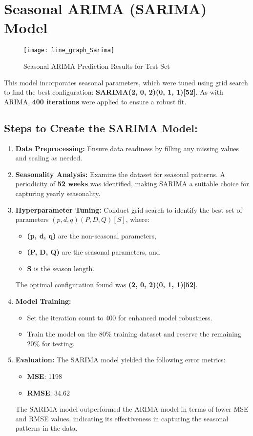 \section*{Seasonal ARIMA (SARIMA) Model}

\begin{figure}[H]
	\centering
	\texttt{[image: line\_graph\_Sarima]}
	\caption{Seasonal ARIMA Prediction Results for Test Set}
	\label{fig:Sarima_result}
\end{figure}

This model incorporates seasonal parameters, which were tuned using grid search to find the best configuration: \textbf{SARIMA(2, 0, 2)(0, 1, 1)[52]}. As with ARIMA, \textbf{400 iterations} were applied to ensure a robust fit.

\subsection*{Steps to Create the SARIMA Model:}
\begin{enumerate}
	\item \textbf{Data Preprocessing:}  
	Ensure data readiness by filling any missing values and scaling as needed.
	
	\item \textbf{Seasonality Analysis:}  
	Examine the dataset for seasonal patterns. A periodicity of \textbf{52 weeks} was identified, making SARIMA a suitable choice for capturing yearly seasonality.
	
	\item \textbf{Hyperparameter Tuning:}  
	Conduct grid search to identify the best set of parameters $(p, d, q)(P, D, Q)[S]$, where:
	\begin{itemize}
		\item \textbf{(p, d, q)} are the non-seasonal parameters,
		\item \textbf{(P, D, Q)} are the seasonal parameters, and
		\item \textbf{S} is the season length.
	\end{itemize}
	The optimal configuration found was \textbf{(2, 0, 2)(0, 1, 1)[52]}.
	
	\item \textbf{Model Training:}
	\begin{itemize}
		\item Set the iteration count to 400 for enhanced model robustness.
		\item Train the model on the 80\% training dataset and reserve the remaining 20\% for testing.
	\end{itemize}
	
	\item \textbf{Evaluation:}  
	The SARIMA model yielded the following error metrics:
	\begin{itemize}
		\item \textbf{MSE}: 1198
		\item \textbf{RMSE}: 34.62
	\end{itemize}
	The SARIMA model outperformed the ARIMA model in terms of lower MSE and RMSE values, indicating its effectiveness in capturing the seasonal patterns in the data.
\end{enumerate}

